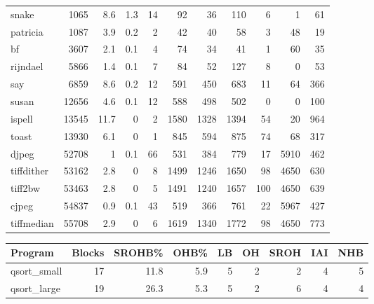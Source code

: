 \begin{tabular}{lrrrrrrrrrr}
 snake           &           1065 &      8.6 &    1.3 &   14 &     92 &         36 &          110 &     6 &     1 &    61 \\
 patricia        &           1087 &      3.9 &    0.2 &    2 &     42 &         40 &           58 &     3 &    48 &    19 \\
 bf              &           3607 &      2.1 &    0.1 &    4 &     74 &         34 &           41 &     1 &    60 &    35 \\
 rijndael        &           5866 &      1.4 &    0.1 &    7 &     84 &         52 &          127 &     8 &     0 &    53 \\
 say             &           6859 &      8.6 &    0.2 &   12 &    591 &        450 &          683 &    11 &    64 &   366 \\
 susan           &          12656 &      4.6 &    0.1 &   12 &    588 &        498 &          502 &     0 &     0 &   100 \\
 ispell          &          13545 &     11.7 &    0   &    2 &   1580 &       1328 &         1394 &    54 &    20 &   964 \\
 toast           &          13930 &      6.1 &    0   &    1 &    845 &        594 &          875 &    74 &    68 &   317 \\
 djpeg           &          52708 &      1   &    0.1 &   66 &    531 &        384 &          779 &    17 &  5910 &   462 \\
 tiffdither      &          53162 &      2.8 &    0   &    8 &   1499 &       1246 &         1650 &    98 &  4650 &   630 \\
 tiff2bw         &          53463 &      2.8 &    0   &    5 &   1491 &       1240 &         1657 &   100 &  4650 &   639 \\
 cjpeg           &          54837 &      0.9 &    0.1 &   43 &    519 &        366 &          761 &    22 &  5967 &   427 \\
 tiffmedian      &          55708 &      2.9 &    0   &    6 &   1619 &       1340 &         1772 &    98 &  4650 &   773 \\
\hline
\end{tabular}\begin{tabular}{lrrrrrrrr}
\hline
 Program         &   Blocks &   SROHB\% &   OHB\% &   LB &   OH &   SROH &   IAI &   NHB \\
\hline
 qsort\_small     &       17 &     11.8 &    5.9 &    5 &    2 &      2 &     4 &     5 \\
 qsort\_large     &       19 &     26.3 &    5.3 &    5 &    2 &      6 &     4 &     4 \\

\end{tabular}
